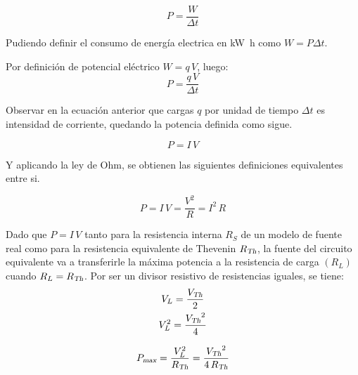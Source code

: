 \begin{mdframed}[style=MyFrame1]
    \begin{defn}
    \end{defn}
    \begin{equation*}
        P = \frac{W}{\Delta t}
    \end{equation*}
\end{mdframed}

Pudiendo definir el consumo de energía electrica en \si{\kilo\watt\hour} como $W = P \Delta t$.

Por definición de potencial eléctrico $W = q \, V$, luego:
\begin{equation*}
    P = \frac{q \, V}{\Delta t}
\end{equation*}

Observar en la ecuación anterior que cargas $q$ por unidad de tiempo $\Delta t$ es intensidad de corriente, quedando la potencia definida como sigue.

\begin{mdframed}[style=MyFrame1]
    \begin{defn}
    \end{defn}
    \begin{equation*}
        P = I \, V
    \end{equation*}
\end{mdframed}

Y aplicando la ley de Ohm, se obtienen las siguientes definiciones equivalentes entre si.

\begin{mdframed}[style=MyFrame1]
    \begin{prop}
    \end{prop}
    \begin{equation*}
        P = I \, V = \frac{V^2}{R} = I^2 \, R
    \end{equation*}
\end{mdframed}

Dado que $P = I \, V$ tanto para la resistencia interna $R_S$ de un modelo de fuente real como para la resistencia equivalente de Thevenin ${{R}_\textsl{{Th}}}$, la fuente del circuito equivalente va a transferirle la máxima potencia a la resistencia de carga $(R_L)$ cuando $R_L={{R}_\textsl{{Th}}}$.
Por ser un divisor resistivo de resistencias iguales, se tiene:
\begin{gather*}
    V_L = \frac{{{V}_\textsl{{Th}}}}{2}
    \\
    V_L^2 = \frac{{{V}_\textsl{{Th}}}^2}{4}
\end{gather*}

\begin{mdframed}[style=MyFrame1]
    \begin{prop}
    \end{prop}
    \begin{equation*}
        {{P}_\textsl{{max}}} = \frac{V_L^2}{{{R}_\textsl{{Th}}}} = \frac{{{V}_\textsl{{Th}}}^2}{4 \, {{R}_\textsl{{Th}}}}
    \end{equation*}
\end{mdframed}